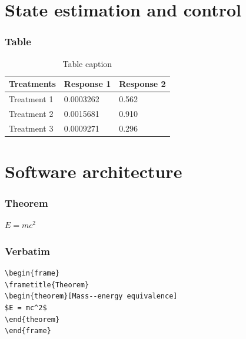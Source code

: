 \documentclass[xcolor=dvipsnames]{beamer}
\begin{document}
\section{State estimation and control}

\begin{frame}
\tableofcontents[sectionstyle=show,square,currentsection]
\end{frame}


\begin{frame}
\frametitle{Table}
\begin{table}
\begin{tabular}{l l l}
\toprule
\textbf{Treatments} & \textbf{Response 1} & \textbf{Response 2}\\
\midrule
Treatment 1 & 0.0003262 & 0.562 \\
Treatment 2 & 0.0015681 & 0.910 \\
Treatment 3 & 0.0009271 & 0.296 \\
\bottomrule
\end{tabular}
\caption{Table caption}
\end{table}
\end{frame}

\section{Software architecture}

\begin{frame}
\tableofcontents[sectionstyle=show,square,currentsection]
\end{frame}

\begin{frame}
\frametitle{Theorem}
\begin{theorem}
$E = mc^2$
\end{theorem}
\end{frame}


\begin{frame}[fragile] %
\frametitle{Verbatim}
\begin{example}
\begin{verbatim}
\begin{frame}
\frametitle{Theorem}
\begin{theorem}[Mass--energy equivalence]
$E = mc^2$
\end{theorem}
\end{frame}\end{verbatim}
\end{example}
\end{frame}
\end{document}
